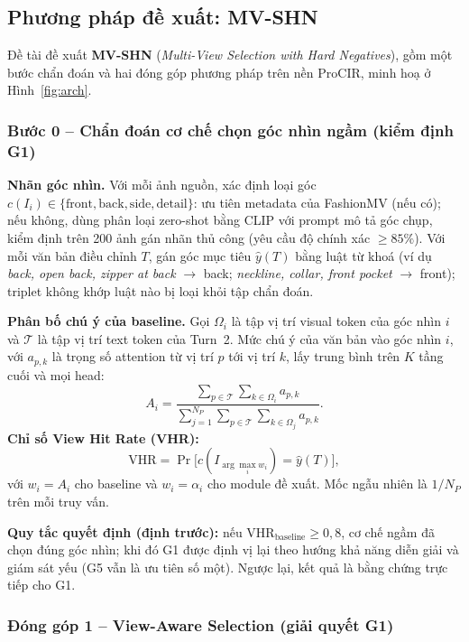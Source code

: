 \documentclass[a4paper]{article}
\begin{document}
\subsection{Phương pháp đề xuất: MV-SHN}
Đề tài đề xuất \textbf{MV-SHN} (\textit{Multi-View Selection with Hard Negatives}), gồm một bước chẩn đoán và hai đóng góp phương pháp trên nền ProCIR, minh hoạ ở Hình~\ref{fig:arch}.

\subsubsection{Bước 0 -- Chẩn đoán cơ chế chọn góc nhìn ngầm (kiểm định G1)}\label{sec:diag}

\textbf{Nhãn góc nhìn.} Với mỗi ảnh nguồn, xác định loại góc $c(I_i) \in \{\text{front}, \text{back}, \text{side}, \text{detail}\}$: ưu tiên metadata của FashionMV (nếu có); nếu không, dùng phân loại zero-shot bằng CLIP với prompt mô tả góc chụp, kiểm định trên 200 ảnh gán nhãn thủ công (yêu cầu độ chính xác $\geq 85\%$). Với mỗi văn bản điều chỉnh $T$, gán góc mục tiêu $\hat{y}(T)$ bằng luật từ khoá (ví dụ \textit{back, open back, zipper at back} $\rightarrow$ back; \textit{neckline, collar, front pocket} $\rightarrow$ front); triplet không khớp luật nào bị loại khỏi tập chẩn đoán.

\textbf{Phân bố chú ý của baseline.} Gọi $\Omega_i$ là tập vị trí visual token của góc nhìn $i$ và $\mathcal{T}$ là tập vị trí text token của Turn~2. Mức chú ý của văn bản vào góc nhìn $i$, với $a_{p,k}$ là trọng số attention từ vị trí $p$ tới vị trí $k$, lấy trung bình trên $K$ tầng cuối và mọi head:
\[
A_i = \frac{\sum_{p\in\mathcal{T}}\sum_{k\in\Omega_i} a_{p,k}}{\sum_{j=1}^{N_P}\sum_{p\in\mathcal{T}}\sum_{k\in\Omega_j} a_{p,k}}.
\]
\textbf{Chỉ số View Hit Rate (VHR):}
\[
\text{VHR} = \Pr\big[c(I_{\arg\max_i w_i}) = \hat{y}(T)\big],
\]
với $w_i = A_i$ cho baseline và $w_i = \alpha_i$ cho module đề xuất. Mốc ngẫu nhiên là $1/N_P$ trên mỗi truy vấn.

\textbf{Quy tắc quyết định (định trước):} nếu $\text{VHR}_{\text{baseline}} \geq 0{,}8$, cơ chế ngầm đã chọn đúng góc nhìn; khi đó G1 được định vị lại theo hướng khả năng diễn giải và giám sát yếu (G5 vẫn là ưu tiên số một). Ngược lại, kết quả là bằng chứng trực tiếp cho G1.

\subsubsection{Đóng góp 1 -- View-Aware Selection (giải quyết G1)}\label{sec:vas}
\end{document}
